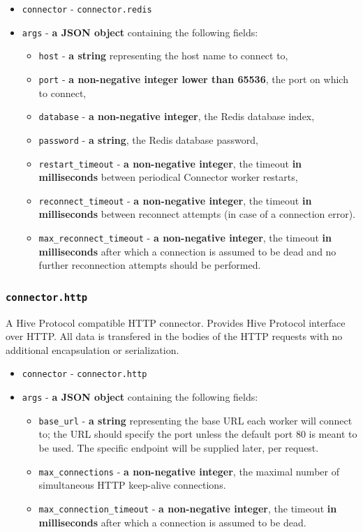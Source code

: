 \documentclass[a4paper]{article}
\begin{document}
\begin{itemize}
\item \texttt{connector} - \texttt{connector.redis}
\item \texttt{args} - \textbf{a JSON object} containing the following fields:
\begin{itemize}
\item \texttt{host} - \textbf{a string} representing the host name to connect to,
\item \texttt{port} - \textbf{a non-negative integer lower than 65536}, the port on which to connect,
\item \texttt{database} - \textbf{a non-negative integer}, the Redis database index,
\item \texttt{password} - \textbf{a string}, the Redis database password,
\item \texttt{restart\_timeout} - \textbf{a non-negative integer}, the timeout \textbf{in milliseconds} between periodical Connector worker restarts,
\item \texttt{reconnect\_timeout} - \textbf{a non-negative integer}, the timeout \textbf{in milliseconds} between reconnect attempts (in case of a connection error).
\item \texttt{max\_reconnect\_timeout} - \textbf{a non-negative integer}, the timeout \textbf{in milliseconds} after which a connection is assumed to be dead and no further reconnection attempts should be performed.
\end{itemize}
\end{itemize}
\subsubsection{\texttt{connector.http}}
\label{sec-9-4-2}
\label{ref-cp_connectors}

A Hive Protocol compatible HTTP connector. Provides Hive Protocol interface over HTTP. All data is transfered in the bodies of the HTTP requests with no additional encapsulation or serialization.


\begin{itemize}
\item \texttt{connector} - \texttt{connector.http}
\item \texttt{args} - \textbf{a JSON object} containing the following fields:
\begin{itemize}
\item \texttt{base\_url} - \textbf{a string} representing the base URL each worker will connect to; the URL should specify the port unless the default port 80 is meant to be used. The specific endpoint will be supplied later, per request.
\item \texttt{max\_connections} - \textbf{a non-negative integer}, the maximal number of simultaneous HTTP keep-alive connections.
\item \texttt{max\_connection\_timeout} - \textbf{a non-negative integer}, the timeout \textbf{in milliseconds} after which a connection is assumed to be dead.
\end{itemize}
\end{itemize}
\end{document}
